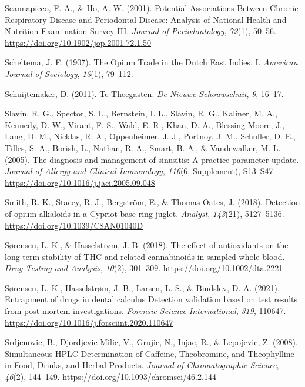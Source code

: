 \documentclass[
  b5paper,
]{book}
\newlength{\cslhangindent}
\newenvironment{CSLReferences}[2] %
 {\begin{list}{}{%
  \setlength{\itemindent}{0pt}
  \setlength{\leftmargin}{0pt}
  \setlength{\parsep}{0pt}
  \ifodd #1
   \setlength{\leftmargin}{\cslhangindent}
   \setlength{\itemindent}{-1\cslhangindent}
  \fi
  \setlength{\itemsep}{#2\baselineskip}}}
 {\end{list}}
\begin{document}
\begin{CSLReferences}{1}{0}
Scannapieco, F. A., \& Ho, A. W. (2001). Potential {Associations Between
Chronic Respiratory Disease} and {Periodontal Disease}: {Analysis} of
{National Health} and {Nutrition Examination Survey III}. \emph{Journal
of Periodontology}, \emph{72}(1), 50--56.
\url{https://doi.org/10.1902/jop.2001.72.1.50}

Scheltema, J. F. (1907). The {Opium Trade} in the {Dutch East Indies}.
{I}. \emph{American Journal of Sociology}, \emph{13}(1), 79--112.

Schuijtemaker, D. (2011). {Te Theegasten}. \emph{De Nieuwe
Schouwschuit}, \emph{9}, 16--17.

Slavin, R. G., Spector, S. L., Bernstein, I. L., Slavin, R. G., Kaliner,
M. A., Kennedy, D. W., Virant, F. S., Wald, E. R., Khan, D. A.,
Blessing-Moore, J., Lang, D. M., Nicklas, R. A., Oppenheimer, J. J.,
Portnoy, J. M., Schuller, D. E., Tilles, S. A., Borish, L., Nathan, R.
A., Smart, B. A., \& Vandewalker, M. L. (2005). The diagnosis and
management of sinusitis: {A} practice parameter update. \emph{Journal of
Allergy and Clinical Immunology}, \emph{116}(6, Supplement), S13--S47.
\url{https://doi.org/10.1016/j.jaci.2005.09.048}

Smith, R. K., Stacey, R. J., Bergström, E., \& Thomas-Oates, J. (2018).
Detection of opium alkaloids in a {Cypriot} base-ring juglet.
\emph{Analyst}, \emph{143}(21), 5127--5136.
\url{https://doi.org/10.1039/C8AN01040D}

Sørensen, L. K., \& Hasselstrøm, J. B. (2018). The effect of
antioxidants on the long-term stability of {THC} and related
cannabinoids in sampled whole blood. \emph{Drug Testing and Analysis},
\emph{10}(2), 301--309. \url{https://doi.org/10.1002/dta.2221}

Sørensen, L. K., Hasselstrøm, J. B., Larsen, L. S., \& Bindslev, D. A.
(2021). Entrapment of drugs in dental calculus \textendash{} {Detection}
validation based on test results from post-mortem investigations.
\emph{Forensic Science International}, \emph{319}, 110647.
\url{https://doi.org/10.1016/j.forsciint.2020.110647}

Srdjenovic, B., Djordjevic-Milic, V., Grujic, N., Injac, R., \&
Lepojevic, Z. (2008). Simultaneous {HPLC Determination} of {Caffeine},
{Theobromine}, and {Theophylline} in {Food}, {Drinks}, and {Herbal
Products}. \emph{Journal of Chromatographic Science}, \emph{46}(2),
144--149. \url{https://doi.org/10.1093/chromsci/46.2.144}


\end{CSLReferences}
\end{document}
